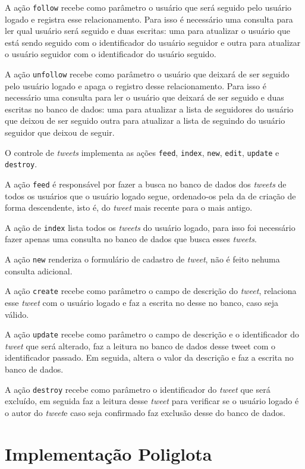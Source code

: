 A ação \verb|follow| recebe como parâmetro o usuário que será seguido pelo usuário logado e registra esse relacionamento. Para isso é necessário uma consulta para ler qual usuário será seguido e duas escritas: uma para atualizar o usuário que está sendo seguido com o identificador do usuário seguidor e outra para atualizar o usuário seguidor com o identificador do usuário seguido.

A ação \verb|unfollow| recebe como parâmetro o usuário que deixará de ser seguido pelo usuário logado e apaga o registro desse relacionamento. Para isso é necessário uma consulta para ler o usuário que deixará de ser seguido e duas escritas no banco de dados: uma para atualizar a lista de seguidores do usuário que deixou de ser seguido outra para atualizar a lista de seguindo do usuário seguidor que deixou de seguir.

O controle de \textit{tweets} implementa as ações \verb|feed|, \verb|index|, \verb|new|, \verb|edit|, \verb|update| e \verb|destroy|.

A ação \verb|feed| é responsável por fazer a busca no banco de dados dos \textit{tweets} de todos os usuários que o usuário logado segue, ordenado-os pela da de criação de forma descendente, isto é, do \textit{tweet} mais recente para o mais antigo.

A ação de \verb|index| lista todos os \textit{tweets} do usuário logado, para isso foi necessário fazer apenas uma consulta no banco de dados que busca esses \textit{tweets}.

A ação \verb|new| renderiza o formulário de cadastro de \textit{tweet}, não é feito nehuma consulta adicional.

A ação \verb|create| recebe como parâmetro o campo de descrição do \textit{tweet}, relaciona esse \textit{tweet} com o usuário logado e faz a escrita no desse no banco, caso seja válido.

A ação \verb|update| recebe como parâmetro o campo de descrição e o identificador do \textit{tweet} que será alterado, faz a leitura no banco de dados desse tweet com o identificador passado. Em seguida, altera o valor da descrição e faz a escrita no banco de dados.

A ação \verb|destroy| recebe como parâmetro o identificador do \textit{tweet} que será excluído, em seguida faz a leitura desse \textit{tweet} para verificar se o usuário logado é o autor do \textit{tweet}e caso seja confirmado faz exclusão desse do banco de dados.


\section{Implementação Poliglota}
\label{sec:polyglot}

